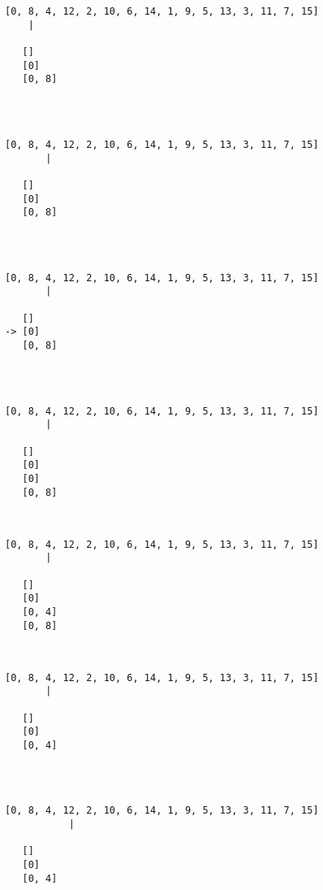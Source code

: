 { \begin{verbatim}
[0, 8, 4, 12, 2, 10, 6, 14, 1, 9, 5, 13, 3, 11, 7, 15]
    |

   []
   [0]
   [0, 8]




\end{verbatim} }

{ \begin{verbatim}
[0, 8, 4, 12, 2, 10, 6, 14, 1, 9, 5, 13, 3, 11, 7, 15]
       |

   []
   [0]
   [0, 8]




\end{verbatim} }

{ \begin{verbatim}
[0, 8, 4, 12, 2, 10, 6, 14, 1, 9, 5, 13, 3, 11, 7, 15]
       |

   []
-> [0]
   [0, 8]




\end{verbatim} }

{ \begin{verbatim}
[0, 8, 4, 12, 2, 10, 6, 14, 1, 9, 5, 13, 3, 11, 7, 15]
       |

   []
   [0]
   [0]
   [0, 8]



\end{verbatim} }

{ \begin{verbatim}
[0, 8, 4, 12, 2, 10, 6, 14, 1, 9, 5, 13, 3, 11, 7, 15]
       |

   []
   [0]
   [0, 4]
   [0, 8]



\end{verbatim} }

{ \begin{verbatim}
[0, 8, 4, 12, 2, 10, 6, 14, 1, 9, 5, 13, 3, 11, 7, 15]
       |

   []
   [0]
   [0, 4]




\end{verbatim} }

{ \begin{verbatim}
[0, 8, 4, 12, 2, 10, 6, 14, 1, 9, 5, 13, 3, 11, 7, 15]
           |

   []
   [0]
   [0, 4]




\end{verbatim} }


